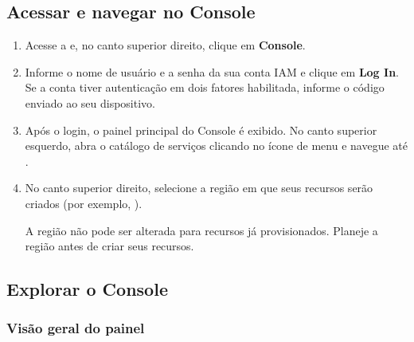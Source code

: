 \documentclass[portuguese]{guide}
\begin{document}
\subsection{Acessar e navegar no Console}


\stepbystep
\begin{enumerate}
  \item Acesse a 
        e, no canto superior direito, clique em \textbf{Console}.


  \item Informe o nome de usuário e a senha da sua conta IAM e clique em
        \textbf{Log In}. Se a conta tiver autenticação em dois fatores habilitada,
        informe o código enviado ao seu dispositivo.

  \item Após o login, o painel principal do Console é exibido. No canto
        superior esquerdo, abra o catálogo de serviços clicando no ícone de
        menu e navegue até .


  \item No canto superior direito, selecione a região em que seus recursos
        serão criados (por exemplo, ).


  \begin{warning}
  A região não pode ser alterada para recursos já provisionados.
  Planeje a região antes de criar seus recursos.
  \end{warning}
\end{enumerate}

\subsection{Explorar o Console}

\subsubsection{Visão geral do painel}
\end{document}
